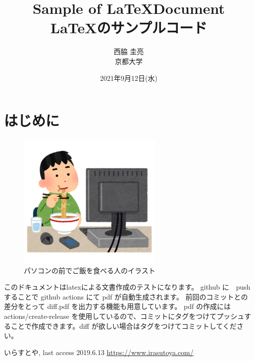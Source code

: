\documentclass[uplatex, twocolumn,10pt]{jsarticle}
\begin{document}
\title{\bf{\LARGE{Sample of \LaTeX  Document} \\ \Large{\LaTeX のサンプルコード}}}
\author{西脇 圭亮\\京都大学}
\date{2021年9月12日(水)}
\maketitle


\section{はじめに}
\begin{figure}[t]
    \begin{center}
        \includegraphics[width=7cm]{images/syokuji_computer.png}
        \caption{パソコンの前でご飯を食べる人のイラスト}
        \label{fig:syokuji_computer}
    \end{center}
\end{figure}

このドキュメントはlatexによる文書作成のテストになります。
github に　push することで github actions にて pdf が自動生成されます。
前回のコミットとの差分をとって diff.pdf を出力する機能も用意しています。
pdf の作成には actions/create-release を使用しているので、コミットにタグをつけてプッシュすることで作成できます。diff が欲しい場合はタグをつけてコミットしてください。

\begin{thebibliography}{99}
     いらすとや, last access 2019.6.13 \url{https://www.irasutoya.com/}



\end{thebibliography}
\end{document}
